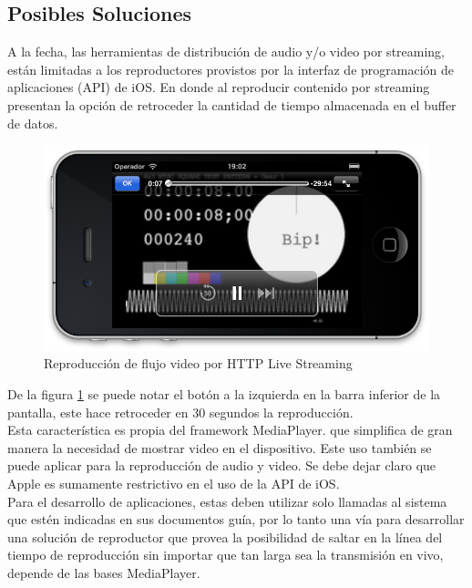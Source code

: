 \newpage
\subsection{Posibles Soluciones}

A la fecha, las herramientas de distribución de audio y/o video por streaming, están limitadas a los reproductores provistos por la interfaz de programación de aplicaciones (API) de iOS. En donde al reproducir contenido por streaming presentan la opción de retroceder la cantidad de  tiempo almacenada en el buffer de datos. \\

\begin{figure}[h!]
	\centering
	\includegraphics[scale=0.55]{imgs/sshot_iOS_hls.png}
	\caption{Reproducción de flujo video por HTTP Live Streaming}
	\label{sshot_iOS_hls}	
\end{figure}

De la figura \ref{sshot_iOS_hls} se puede notar el botón a la izquierda en la barra inferior de  la pantalla, este hace retroceder en 30 segundos la reproducción.\\

Esta característica es propia del framework MediaPlayer. que simplifica de gran manera la necesidad de mostrar video en el dispositivo. Este uso también se puede aplicar para la reproducción  de  audio y video.
Se debe dejar claro que Apple es sumamente restrictivo en el uso de la API de iOS. \\
Para el desarrollo de aplicaciones, estas deben utilizar solo llamadas al sistema que estén indicadas en sus documentos guía, por lo tanto una vía para desarrollar una solución de reproductor que provea la posibilidad de saltar en la línea del tiempo de reproducción sin importar que tan larga sea la transmisión en vivo, depende de las bases MediaPlayer. \\

